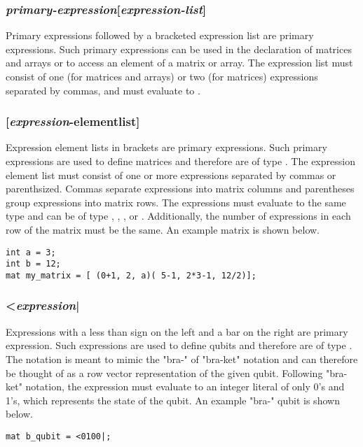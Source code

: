 \subsubsection{\textit{primary-expression}[\textit{expression-list}]}
Primary expressions followed by a bracketed expression list are primary expressions. Such primary expressions can be used in the declaration of matrices and arrays or to access an element of a matrix or array. The expression list must consist of one (for matrices and arrays) or two (for matrices) expressions separated by commas, and must evaluate to \integ.

\subsubsection{[\textit{expression}-elementlist]}
Expression element lists in brackets are primary expressions. Such primary expressions are used to define matrices and therefore are of type \mat. The expression element list must consist of one or more expressions separated by commas or parenthsized. Commas separate expressions into matrix columns and parentheses group expressions into matrix rows. The expressions must evaluate to the same type and can be of type \integ, \float, \complex, or \mat. Additionally, the number of expressions in each row of the matrix must be the same. An example matrix is shown below.

\begin{lstlisting}
int a = 3;
int b = 12;
mat my_matrix = [ (0+1, 2, a)( 5-1, 2*3-1, 12/2)];
\end{lstlisting}

\subsubsection{<\textit{expression}|}
Expressions with a less than sign on the left and a bar on the right are primary expression. Such expressions are used to define qubits and therefore are of type \mat. The notation is meant to mimic the "bra-" of "bra-ket" notation and can therefore be thought of as a row vector representation of the given qubit. Following "bra-ket" notation, the expression must evaluate  to an integer literal of only 0's and 1's, which represents the state of the qubit. An example "bra-" qubit is shown below.

\begin{lstlisting}
mat b_qubit = <0100|;
\end{lstlisting}

